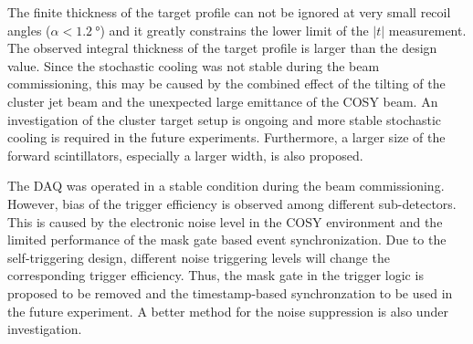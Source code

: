 \documentclass[number,5p]{elsarticle}
\begin{document}
The finite thickness of the target profile can not be ignored at
very small recoil angles ($\alpha < \SI{1.2}{\degree}$) and it greatly
constrains the lower limit of the $|t|$ measurement.
The observed integral thickness of the target profile is larger than the design value.
Since the stochastic cooling was not stable during the beam commissioning, this may be caused by the combined effect of the tilting of the cluster jet
beam and the unexpected large emittance of the COSY beam.
An investigation of the cluster target setup is ongoing and more stable stochastic cooling is required in the future experiments.
Furthermore, a larger size of the forward scintillators, especially a larger width, is also proposed.

The DAQ was operated in a stable condition during the beam commissioning.
However, bias of the trigger efficiency is observed among different sub-detectors.
This is caused by the electronic noise level in the COSY environment
and the limited performance of the mask gate based event synchronization.
Due to the self-triggering design, different noise triggering levels will change the corresponding trigger efficiency.
Thus, the mask gate in the trigger logic is proposed to be removed and the timestamp-based synchronzation to be used in the future experiment.
A better method for the noise suppression is also under investigation.



\end{document}
